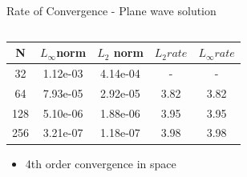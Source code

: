 \documentclass[10pt, aspectratio=169]{beamer}
\begin{document}
\begin{frame}{Rate of Convergence - Plane wave solution}
	\begin{columns}
		\begin{column}{0.45\textwidth}
			\begin{tabular}{ |c|c|c|c|c| } 
				\hline
				N   & $L_{\infty}$norm & $L_{2}$ norm & $L_{2} rate$ & $L_{\infty} rate$ \\ 
				\hline
				32  & 1.12e-03         & 4.14e-04     & -            & -                 \\
				64  & 7.93e-05         & 2.92e-05     & 3.82         & 3.82              \\
				128 & 5.10e-06         & 1.88e-06     & 3.95         & 3.95              \\
				256 & 3.21e-07         & 1.18e-07     & 3.98         & 3.98              \\
				\hline
			\end{tabular}
			\begin{itemize}
				\item 4th order convergence in space
			\end{itemize}
		\end{column}
		\begin{column}{0.45\textwidth}
		\end{column}
	\end{columns}	
\end{frame}
\end{document}
